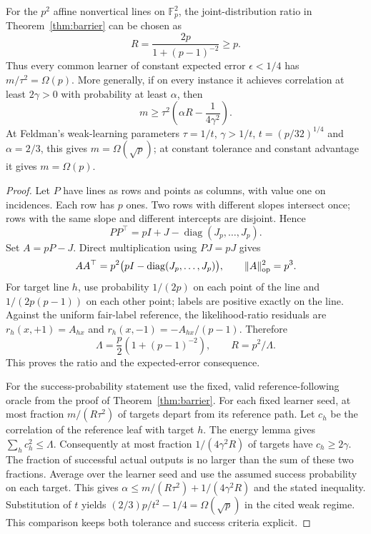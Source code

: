 \begin{samepage}
\begin{proposition}\label{prop:affine}
For the $p^2$ affine nonvertical lines on $\mathbb F_p^2$, the joint-distribution ratio in Theorem~\ref{thm:barrier} can be chosen as
\[
 R=\frac{2p}{1+(p-1)^{-2}}\ge p.
\]
Thus every common learner of constant expected error $\epsilon<1/4$ has $m/\tau^2=\Omega(p)$. More generally, if on every instance it achieves correlation at least $2\gamma>0$ with probability at least $\alpha$, then
\[
 m\ge\tau^2\left(\alpha R-\frac1{4\gamma^2}\right).
\]
At Feldman's weak-learning parameters $\tau=1/t$, $\gamma>1/t$, $t=(p/32)^{1/4}$ and $\alpha=2/3$, this gives $m=\Omega(\sqrt p)$; at constant tolerance and constant advantage it gives $m=\Omega(p)$.
\end{proposition}
\end{samepage}
\begin{proof}
Let $P$ have lines as rows and points as columns, with value one on incidences. Each row has $p$ ones. Two rows with different slopes intersect once; rows with the same slope and different intercepts are disjoint. Hence
\[
 PP^\top=pI+J-\operatorname{diag}(J_p,\ldots,J_p).
\]
Set $A=pP-J$. Direct multiplication using $PJ=pJ$ gives
\[
 AA^\top=p^2\bigl(pI-\operatorname{diag}(J_p,\ldots,J_p)\bigr),
 \qquad \|A\|_{\rm op}^2=p^3.
\]
For target line $h$, use probability $1/(2p)$ on each point of the line and $1/(2p(p-1))$ on each other point; labels are positive exactly on the line. Against the uniform fair-label reference, the likelihood-ratio residuals are $r_h(x,+1)=A_{hx}$ and $r_h(x,-1)=-A_{hx}/(p-1)$. Therefore
\[
 \Lambda=\frac p2(1+(p-1)^{-2}),\qquad R=p^2/\Lambda.
\]
This proves the ratio and the expected-error consequence.

For the success-probability statement use the fixed, valid reference-following oracle from the proof of Theorem~\ref{thm:barrier}. For each fixed learner seed, at most fraction $m/(R\tau^2)$ of targets depart from its reference path. Let $c_h$ be the correlation of the reference leaf with target $h$. The energy lemma gives $\sum_hc_h^2\le\Lambda$. Consequently at most fraction $1/(4\gamma^2R)$ of targets have $c_h\ge2\gamma$. The fraction of successful actual outputs is no larger than the sum of these two fractions. Average over the learner seed and use the assumed success probability on each target. This gives $\alpha\le m/(R\tau^2)+1/(4\gamma^2R)$ and the stated inequality. Substitution of $t$ yields $(2/3)p/t^2-1/4=\Omega(\sqrt p)$ in the cited weak regime. This comparison keeps both tolerance and success criteria explicit.
\end{proof}
